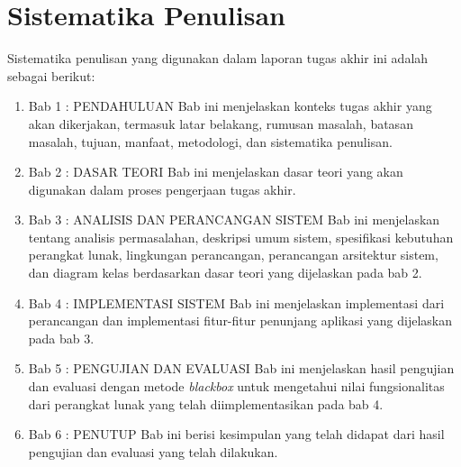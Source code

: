 \section {Sistematika Penulisan}
Sistematika penulisan yang digunakan dalam laporan tugas akhir ini adalah sebagai berikut:
\begin{enumerate}
\item Bab 1 : PENDAHULUAN
Bab ini menjelaskan konteks tugas akhir yang akan dikerjakan, termasuk latar belakang, rumusan masalah, batasan masalah, tujuan, manfaat, metodologi, dan sistematika penulisan.
\item Bab 2 : DASAR TEORI
Bab ini menjelaskan dasar teori yang akan digunakan dalam proses pengerjaan tugas akhir.
\item Bab 3 : ANALISIS DAN PERANCANGAN SISTEM
Bab ini menjelaskan tentang analisis permasalahan, deskripsi umum sistem, spesifikasi kebutuhan perangkat lunak, lingkungan perancangan, perancangan arsitektur sistem, dan diagram kelas berdasarkan dasar teori yang dijelaskan pada bab 2.
\item Bab 4 : IMPLEMENTASI SISTEM
Bab ini menjelaskan implementasi dari perancangan dan implementasi fitur-fitur penunjang aplikasi yang dijelaskan pada bab 3.
\item Bab 5 : PENGUJIAN DAN EVALUASI
Bab ini menjelaskan hasil pengujian dan evaluasi dengan metode \textit{blackbox} untuk mengetahui nilai fungsionalitas dari perangkat lunak yang telah diimplementasikan pada bab 4.
\item Bab 6 : PENUTUP
Bab ini berisi kesimpulan yang telah didapat dari hasil pengujian dan evaluasi yang telah dilakukan.
\end{enumerate}
